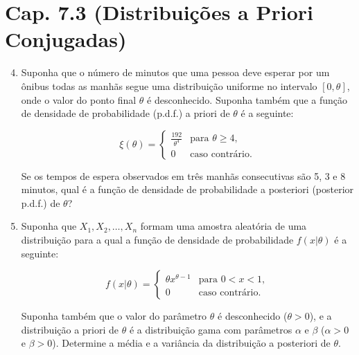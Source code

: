 \documentclass[leqno, 12pt]{article}
\theoremstyle{definition}
\newcommand{\rs}{X_1, X_2, \ldots, X_n} %
\begin{document}
\section*{Cap. 7.3 (Distribuições a Priori Conjugadas)}

\begin{enumerate}
\setcounter{enumi}{3}


\item \textbf{\parencite[ex. 17, pág. 407]{DeGroot:2014}} Suponha que o número de minutos que uma pessoa deve esperar por um ônibus todas as manhãs segue uma distribuição uniforme no intervalo $[0, \theta]$, onde o valor do ponto final $\theta$ é desconhecido. Suponha também que a função de densidade de probabilidade (p.d.f.) a priori de $\theta$ é a seguinte:

\[
\xi(\theta) =
\begin{cases}
\frac{192}{\theta^4} & \text{para } \theta \geq 4, \\
0 & \text{caso contrário.}
\end{cases}
\]

Se os tempos de espera observados em três manhãs consecutivas são 5, 3 e 8 minutos, qual é a função de densidade de probabilidade a posteriori (posterior p.d.f.) de $\theta$?


\item \textbf{\parencite[ex. 19, pág. 407]{DeGroot:2014}} Suponha que \(\rs\) formam uma amostra aleatória de uma distribuição para a qual a função de densidade de probabilidade \(f(x|\theta)\) é a seguinte:

\[
f(x|\theta) =
\begin{cases}
\theta x^{\theta-1} & \text{para } 0 < x < 1, \\
0 & \text{caso contrário.}
\end{cases}
\]

Suponha também que o valor do parâmetro \(\theta\) é desconhecido (\(\theta > 0\)), e a distribuição a priori de \(\theta\) é a distribuição gama com parâmetros \(\alpha\) e \(\beta\) (\(\alpha > 0\) e \(\beta > 0\)). Determine a média e a variância da distribuição a posteriori de \(\theta\).


\end{enumerate}
\end{document}
